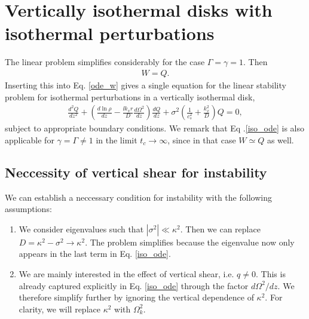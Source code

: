 \section{Vertically isothermal disks with 
  isothermal perturbations}
The linear problem simplifies considerably for the case
$\Gamma=\gamma=1$. Then 
\begin{align}
  W=Q. 
\end{align}
Inserting this into Eq. \ref{ode_w} gives a single equation for the linear stability
problem for isothermal perturbations in a vertically isothermal disk, 
\begin{align}\label{iso_ode}
  \frac{d^2Q}{dz^2} + \left(\frac{d\ln{\rho}}{dz} - \frac{\ii k_x
      r}{D}\frac{d\Omega^2}{dz}\right) \frac{dQ}{dz} +
  \sigma^2\left(\frac{1}{c_s^2} + \frac{k_x^2}{D}\right)Q=0, 
\end{align} 
subject to appropriate boundary conditions. 
We remark that Eq .\ref{iso_ode} is also applicable for
$\gamma=\Gamma\neq 1$ in the limit $t_c\to\infty$, since in that case
$W\simeq Q$ as well. 

\subsection{Neccessity of vertical shear for instability}\label{integral_relation}
We can establish a neccessary condition for instability with the
following assumptions:

\begin{enumerate}
\item We consider eigenvalues such that
  $|\sigma^2|\ll \kappa^2$. Then we can replace $D=\kappa^2 -\sigma^2\to
  \kappa^2$. The problem simplifies because the eigenvalue now only
  appears in the last term in Eq. \ref{iso_ode}. 
\item We are mainly interested in the effect of vertical shear, i.e. $q\neq
0$. This is already captured explicitly in Eq. \ref{iso_ode} through
the factor $d\Omega^2/dz$. We 
therefore simplify further by ignoring the vertical dependence of
$\kappa^2$. For clarity, we will replace  $\kappa^2$ with $\Omega_k^2$.  
\end{enumerate}

